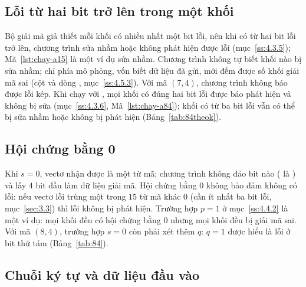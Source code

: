 \subsection{Lỗi từ hai bit trở lên trong một khối}
\label{ss:4.6.2}

Bộ giải mã giả thiết mỗi khối có nhiều nhất một bit lỗi, nên khi có từ hai bit
lỗi trở lên, chương trình sửa nhầm hoặc không phát hiện được lỗi
(mục~\ref{ss:4.3.5}); Mã~\ref{lst:chay-a15} là một ví dụ sửa nhầm. Chương trình
không tự biết khối nào bị sửa nhầm; chỉ phía mô phỏng, vốn biết dữ liệu đã gửi,
mới đếm được số khối giải mã sai (cột  và dòng
, mục~\ref{ss:4.5.3}). Với mã $(7,4)$, chương trình không
báo được lỗi kép. Khi chạy với , mọi khối có đúng hai bit lỗi được
báo phát hiện và không bị sửa (mục~\ref{ss:4.3.6}, Mã~\ref{lst:chay-a84}); khối
có từ ba bit lỗi vẫn có thể bị sửa nhầm hoặc không bị phát hiện
(Bảng~\ref{tab:84theok}).

\subsection{Hội chứng bằng 0}
\label{ss:4.6.3}

Khi $s = 0$, vectơ nhận được là một từ mã; chương trình không đảo bit nào
( là ) và lấy $4$ bit đầu làm dữ liệu giải mã.
Hội chứng bằng $0$ không bảo đảm không có lỗi: nếu vectơ lỗi trùng một trong
$15$ từ mã khác $0$ (cần ít nhất ba bit lỗi, mục~\ref{sec:3.3}) thì lỗi không bị
phát hiện. Trường hợp $p = 1$ ở mục~\ref{ss:4.4.2} là một ví dụ: mọi khối đều có
hội chứng bằng $0$ nhưng mọi khối đều bị giải mã sai. Với mã $(8,4)$, trường hợp
$s = 0$ còn phải xét thêm $q$: $q = 1$ được hiểu là lỗi ở bit thứ tám
(Bảng~\ref{tab:84}).

\subsection{Chuỗi ký tự và dữ liệu đầu vào}
\label{ss:4.6.4}

